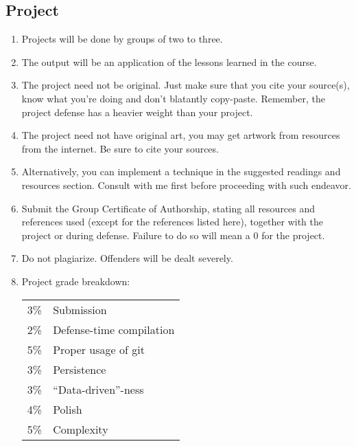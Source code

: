 \documentclass[10pt]{article}
\begin{document}
\subsection{Project}
\begin{enumerate}[noitemsep]
\item Projects will be done by groups of two to three.
\item The output will be an application of the lessons learned in the course.
\item The project need not be original. Just make sure that you cite your source(s), know what you're doing and don't blatantly copy-paste. Remember, the project defense has a heavier weight than your project.
\item The project need not have original art, you may get artwork from resources from the internet. Be sure to cite your sources.
\item Alternatively, you can implement a technique in the suggested readings and resources section. Consult with me first before proceeding with such endeavor. 
\item Submit the Group Certificate of Authorship, stating all resources and references used (except for the references listed here), together with the project or during defense. Failure to do so will mean a 0 for the project.
\item Do not plagiarize. Offenders will be dealt severely.
\item Project grade breakdown:
\begin{center}
\begin{tabular}{rl}
3\% & Submission\\
2\% & Defense-time compilation\\
5\% & Proper usage of git\\
3\% & Persistence\\
3\% & ``Data-driven''-ness\\
4\% & Polish\\
5\% & Complexity\\
\end{tabular}
\end{center}
\end{enumerate}
\end{document}
